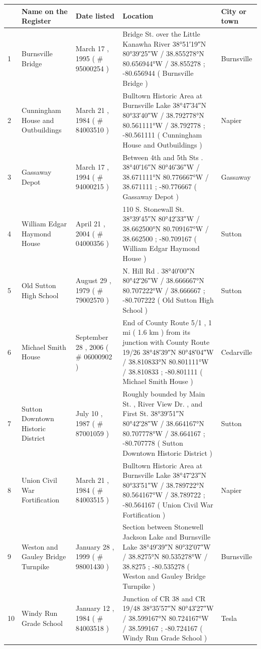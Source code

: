 \documentclass{article}
\begin{document}
\begin{tabular}{lllll}
\toprule
 & Name on the Register & Date listed & Location & City or town \\
\midrule
1 & Burnsville Bridge & March 17 , 1995 ( \# 95000254 ) & Bridge St. over the Little Kanawha River 38°51′19″N 80°39′25″W / 38.855278°N 80.656944°W / 38.855278 ; -80.656944 ( Burnsville Bridge ) & Burnsville \\
2 & Cunningham House and Outbuildings & March 21 , 1984 ( \# 84003510 ) & Bulltown Historic Area at Burnsville Lake 38°47′34″N 80°33′40″W / 38.792778°N 80.561111°W / 38.792778 ; -80.561111 ( Cunningham House and Outbuildings ) & Napier \\
3 & Gassaway Depot & March 17 , 1994 ( \# 94000215 ) & Between 4th and 5th Sts . 38°40′16″N 80°46′36″W / 38.671111°N 80.776667°W / 38.671111 ; -80.776667 ( Gassaway Depot ) & Gassaway \\
4 & William Edgar Haymond House & April 21 , 2004 ( \# 04000356 ) & 110 S. Stonewall St. 38°39′45″N 80°42′33″W / 38.662500°N 80.709167°W / 38.662500 ; -80.709167 ( William Edgar Haymond House ) & Sutton \\
5 & Old Sutton High School & August 29 , 1979 ( \# 79002570 ) & N. Hill Rd . 38°40′00″N 80°42′26″W / 38.666667°N 80.707222°W / 38.666667 ; -80.707222 ( Old Sutton High School ) & Sutton \\
6 & Michael Smith House & September 28 , 2006 ( \# 06000902 ) & End of County Route 5/1 , 1 mi ( 1.6 km ) from its junction with County Route 19/26 38°48′39″N 80°48′04″W / 38.810833°N 80.801111°W / 38.810833 ; -80.801111 ( Michael Smith House ) & Cedarville \\
7 & Sutton Downtown Historic District & July 10 , 1987 ( \# 87001059 ) & Roughly bounded by Main St. , River View Dr. , and First St. 38°39′51″N 80°42′28″W / 38.664167°N 80.707778°W / 38.664167 ; -80.707778 ( Sutton Downtown Historic District ) & Sutton \\
8 & Union Civil War Fortification & March 21 , 1984 ( \# 84003515 ) & Bulltown Historic Area at Burnsville Lake 38°47′23″N 80°33′51″W / 38.789722°N 80.564167°W / 38.789722 ; -80.564167 ( Union Civil War Fortification ) & Napier \\
9 & Weston and Gauley Bridge Turnpike & January 28 , 1999 ( \# 98001430 ) & Section between Stonewell Jackson Lake and Burnsville Lake 38°49′39″N 80°32′07″W / 38.8275°N 80.535278°W / 38.8275 ; -80.535278 ( Weston and Gauley Bridge Turnpike ) & Burnsville \\
10 & Windy Run Grade School & January 12 , 1984 ( \# 84003518 ) & Junction of CR 38 and CR 19/48 38°35′57″N 80°43′27″W / 38.599167°N 80.724167°W / 38.599167 ; -80.724167 ( Windy Run Grade School ) & Tesla \\
\bottomrule
\end{tabular}
\end{document}
